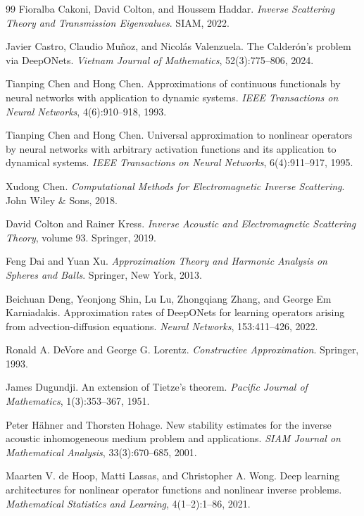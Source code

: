\documentclass{article}
\numberwithin{equation}{section}
\theoremstyle{plain}
\begin{document}
\begin{thebibliography}{99}
		 Fioralba Cakoni, David Colton, and Houssem Haddar. \textit{Inverse Scattering Theory and Transmission Eigenvalues}. SIAM, 2022.
		
		 Javier Castro, Claudio Mu\~noz, and Nicol\'as Valenzuela. The Calder\'on's problem via DeepONets. \textit{Vietnam Journal of Mathematics}, 52(3):775--806, 2024.
		
		 Tianping Chen and Hong Chen. Approximations of continuous functionals by neural networks with application to dynamic systems. \textit{IEEE Transactions on Neural Networks}, 4(6):910--918, 1993.
		
		 Tianping Chen and Hong Chen. Universal approximation to nonlinear operators by neural networks with arbitrary activation functions and its application to dynamical systems. \textit{IEEE Transactions on Neural Networks}, 6(4):911--917, 1995.
		
		 Xudong Chen. \textit{Computational Methods for Electromagnetic Inverse Scattering}. John Wiley \& Sons, 2018.
		
		 David Colton and Rainer Kress. \textit{Inverse Acoustic and Electromagnetic Scattering Theory}, volume 93. Springer, 2019.
		
		 Feng Dai and Yuan Xu. \textit{Approximation Theory and Harmonic Analysis on Spheres and Balls}. Springer, New York, 2013.
		
		 Beichuan Deng, Yeonjong Shin, Lu Lu, Zhongqiang Zhang, and George Em Karniadakis. Approximation rates of DeepONets for learning operators arising from advection-diffusion equations. \textit{Neural Networks}, 153:411--426, 2022.
		
		 Ronald A. DeVore and George G. Lorentz. \textit{Constructive Approximation}. Springer, 1993.
		
		 James Dugundji.
		An extension of Tietze's theorem. \textit{Pacific Journal of Mathematics}, 1(3):353--367, 1951.
		
		 Peter H\"ahner and Thorsten Hohage. New stability estimates for the inverse acoustic inhomogeneous medium problem and applications. \textit{SIAM Journal on Mathematical Analysis}, 33(3):670--685, 2001.
		
		 Maarten V. de Hoop, Matti Lassas, and Christopher A. Wong. Deep learning architectures for nonlinear operator functions and nonlinear inverse problems. \textit{Mathematical Statistics and Learning}, 4(1--2):1--86, 2021.
		

\end{thebibliography}
\end{document}
